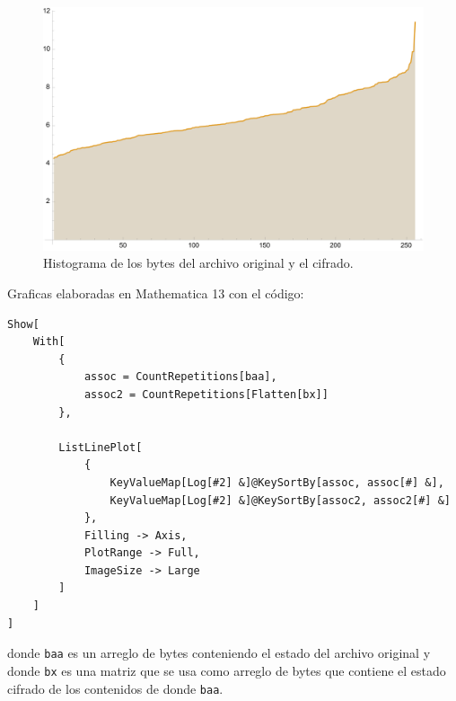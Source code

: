 \documentclass[a4paper]{article}
\begin{document}
\begin{figure}[H]
    \centering
    \includegraphics[scale=0.7]{historygram}
    \caption*{Histograma de los bytes del archivo
original y el cifrado.}\label{fig:d2}
\end{figure}

Graficas elaboradas en Mathematica 13 con el código:

\begin{verbatim}
Show[
    With[
        {
            assoc = CountRepetitions[baa],
            assoc2 = CountRepetitions[Flatten[bx]]
        },
        
        ListLinePlot[
            {
                KeyValueMap[Log[#2] &]@KeySortBy[assoc, assoc[#] &],
                KeyValueMap[Log[#2] &]@KeySortBy[assoc2, assoc2[#] &]
            },
            Filling -> Axis,
            PlotRange -> Full,
            ImageSize -> Large
        ]
    ]
]
\end{verbatim}

donde \texttt{baa} es un arreglo de bytes conteniendo el estado del archivo
original y donde \texttt{bx} es una matriz que se usa como arreglo de bytes que
contiene el estado cifrado de los contenidos de donde \texttt{baa}.
\end{document}

